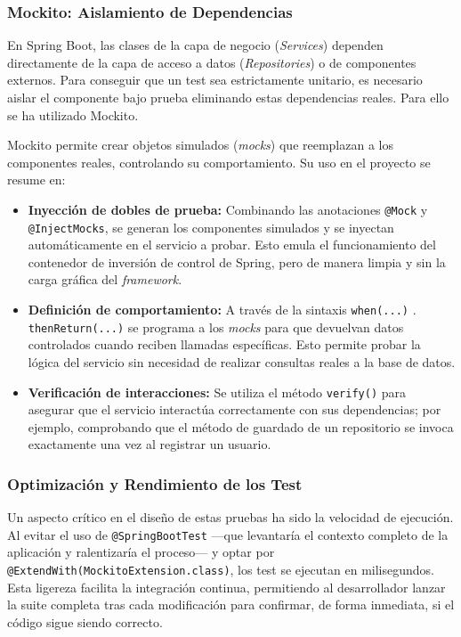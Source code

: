 \subsubsection{Mockito: Aislamiento de Dependencias}
En Spring Boot, las clases de la capa de negocio (\textit{Services}) dependen directamente de la capa de acceso a datos (\textit{Repositories}) o de componentes externos. Para conseguir que un test sea estrictamente unitario, es necesario aislar el componente bajo prueba eliminando estas dependencias reales. Para ello se ha utilizado Mockito.

Mockito permite crear objetos simulados (\textit{mocks}) que reemplazan a los componentes reales, controlando su comportamiento. Su uso en el proyecto se resume en:
\begin{itemize}
    \item \textbf{Inyección de dobles de prueba:} Combinando las anotaciones \texttt{@Mock} y \texttt{@InjectMocks}, 
    se generan los componentes simulados y se inyectan automáticamente en el servicio a probar. Esto emula el funcionamiento
     del contenedor de inversión de control de Spring, pero de manera limpia y sin la carga gráfica del \textit{framework}.
    \item \textbf{Definición de comportamiento:} A través de la sintaxis \texttt{when(...)} . \texttt{thenReturn(...)} se programa a los 
    \textit{mocks} para que devuelvan datos controlados cuando reciben llamadas específicas. Esto permite probar la lógica del servicio sin necesidad de realizar consultas reales a la base de datos.
    \item \textbf{Verificación de interacciones:} Se utiliza el método \texttt{verify()} para asegurar que el servicio interactúa correctamente con sus dependencias; por ejemplo, comprobando que el método de guardado de un repositorio se invoca exactamente una vez al registrar un usuario.
\end{itemize}

\subsubsection{Optimización y Rendimiento de los Test}
Un aspecto crítico en el diseño de estas pruebas ha sido la velocidad de ejecución. Al evitar el uso de \texttt{@SpringBootTest} —que levantaría el contexto completo de la aplicación y ralentizaría el proceso— y optar por \texttt{@ExtendWith(MockitoExtension.class)}, los test se ejecutan en milisegundos. Esta ligereza facilita la integración continua, permitiendo al desarrollador lanzar la suite completa tras cada modificación para confirmar, de forma inmediata, si el código sigue siendo correcto.

